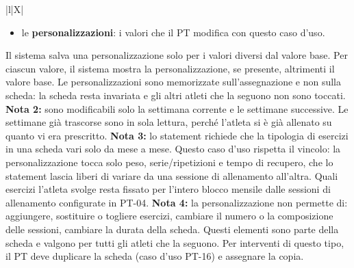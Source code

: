 \documentclass[../../../../SoftwareRequirementsSpecification.tex]{subfiles}
\begin{document}
\begin{xltabular}{\textwidth}{|l|X|}
{\begin{itemize}
      \item le \textbf{personalizzazioni}: i valori che il PT
        modifica con questo caso d'uso.
    \end{itemize}
    Il sistema salva una personalizzazione solo per i valori diversi
    dal valore base. Per ciascun valore, il sistema mostra la
    personalizzazione, se presente, altrimenti il valore base. Le
    personalizzazioni sono memorizzate sull'assegnazione e non sulla
    scheda: la scheda resta invariata e gli altri atleti che la
    seguono non sono toccati.\newline
    \textbf{Nota 2:} sono modificabili solo la settimana corrente e
    le settimane successive. Le settimane già trascorse sono in sola
    lettura, perché l'atleta si è già allenato su quanto vi era
    prescritto.\newline
    \textbf{Nota 3:} lo statement richiede che la tipologia di
    esercizi in una scheda vari solo da mese a mese. Questo caso
    d'uso rispetta il vincolo: la personalizzazione tocca solo peso,
    serie/ripetizioni e tempo di recupero, che lo statement lascia
    liberi di variare da una sessione di allenamento all'altra. Quali
    esercizi l'atleta svolge resta fissato per l'intero blocco mensile
    dalle sessioni di allenamento configurate in PT-04.\newline
    \textbf{Nota 4:} la personalizzazione non permette di: aggiungere,
    sostituire o togliere esercizi, cambiare il numero o la
    composizione delle sessioni, cambiare la durata della scheda.
    Questi elementi sono parte della scheda e valgono per tutti gli
    atleti che la seguono. Per interventi di questo tipo, il PT deve
    duplicare la scheda (caso d'uso PT-16) e assegnare la copia.
  } \\ \hline
\end{xltabular}
\end{document}
